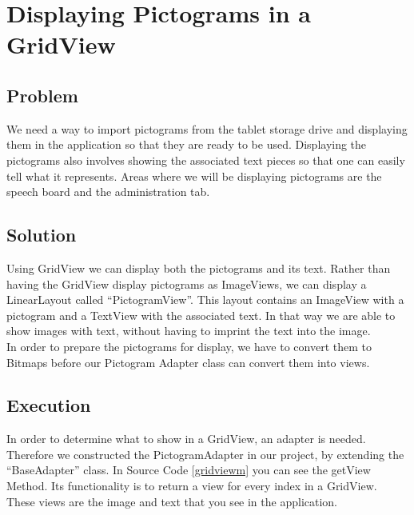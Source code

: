 \section{Displaying Pictograms in a GridView} %
\label{disppict}

\subsection*{Problem}
We need a way to import pictograms from the tablet storage drive and displaying them in the application so that they are ready to be used.
Displaying the pictograms also involves showing the associated text pieces so that one can easily tell what it represents.
Areas where we will be displaying pictograms are the speech board and the administration tab.

\subsection*{Solution}
Using GridView we can display both the pictograms and its text.
Rather than having the GridView display pictograms as ImageViews, we can display a LinearLayout called ``PictogramView''.
This layout contains an ImageView with a pictogram and a TextView with the associated text.
In that way we are able to show images with text, without having to imprint the text into the image.\\

In order to prepare the pictograms for display, we have to convert them to Bitmaps before our Pictogram Adapter class can convert them into views.

\subsection*{Execution}
In order to determine what to show in a GridView, an adapter is needed. Therefore we constructed the PictogramAdapter in our project, by extending the ``BaseAdapter'' class.
In Source Code \ref{gridviewm} you can see the getView Method. Its functionality is to return a view for every index in a GridView.
These views are the image and text that you see in the application.\\

